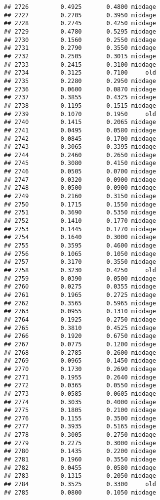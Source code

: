 \documentclass[
]{article}
\begin{document}
\begin{verbatim}
## 2726         0.4925       0.4800 middage
## 2727         0.2705       0.3950 middage
## 2728         0.2745       0.4250 middage
## 2729         0.4780       0.5295 middage
## 2730         0.1560       0.2550 middage
## 2731         0.2790       0.3550 middage
## 2732         0.2505       0.3015 middage
## 2733         0.2415       0.3100 middage
## 2734         0.3125       0.7100     old
## 2735         0.2280       0.2950 middage
## 2736         0.0600       0.0870 middage
## 2737         0.3855       0.4325 middage
## 2738         0.1195       0.1515 middage
## 2739         0.1070       0.1950     old
## 2740         0.1415       0.2065 middage
## 2741         0.0495       0.0580 middage
## 2742         0.0845       0.1700 middage
## 2743         0.3065       0.3395 middage
## 2744         0.2460       0.2650 middage
## 2745         0.3080       0.4150 middage
## 2746         0.0505       0.0700 middage
## 2747         0.0320       0.0900 middage
## 2748         0.0500       0.0900 middage
## 2749         0.2160       0.3150 middage
## 2750         0.1715       0.1550 middage
## 2751         0.3690       0.5350 middage
## 2752         0.1410       0.1770 middage
## 2753         0.1445       0.1770 middage
## 2754         0.1640       0.3000 middage
## 2755         0.3595       0.4600 middage
## 2756         0.1065       0.1050 middage
## 2757         0.3170       0.3550 middage
## 2758         0.3230       0.4250     old
## 2759         0.0390       0.0500 middage
## 2760         0.0275       0.0355 middage
## 2761         0.1965       0.2725 middage
## 2762         0.3565       0.5965 middage
## 2763         0.0955       0.1310 middage
## 2764         0.1925       0.2750 middage
## 2765         0.3810       0.4525 middage
## 2766         0.1920       0.6750 middage
## 2767         0.0775       0.1200 middage
## 2768         0.2785       0.2600 middage
## 2769         0.0965       0.1450 middage
## 2770         0.1730       0.2690 middage
## 2771         0.1955       0.2640 middage
## 2772         0.0365       0.0550 middage
## 2773         0.0585       0.0605 middage
## 2774         0.3035       0.4000 middage
## 2775         0.1805       0.2100 middage
## 2776         0.1155       0.3500 middage
## 2777         0.3935       0.5165 middage
## 2778         0.3005       0.2750 middage
## 2779         0.2275       0.3000 middage
## 2780         0.1435       0.2200 middage
## 2781         0.1960       0.3550 middage
## 2782         0.0455       0.0580 middage
## 2783         0.1315       0.2050 middage
## 2784         0.3525       0.3300     old
## 2785         0.0800       0.1050 middage

\end{verbatim}
\end{document}
